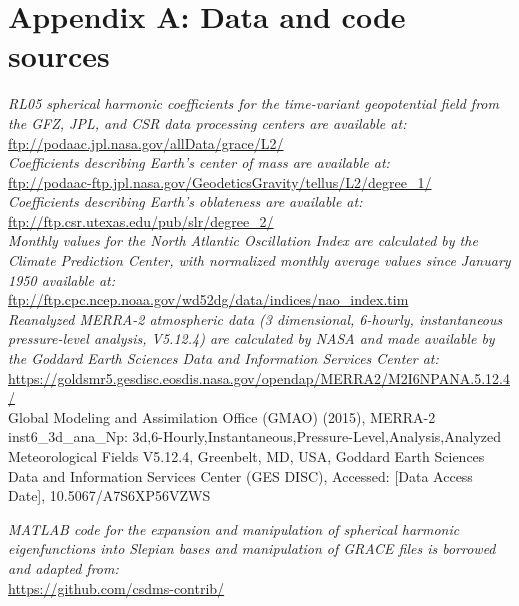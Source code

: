\newpage 
\appendix

\section{Appendix A: Data and code sources \label{app:a}}
\textit{RL05 spherical harmonic coefficients for the time-variant geopotential field from the GFZ, JPL, and CSR data processing centers are available at:} \\
\indent \url{ftp://podaac.jpl.nasa.gov/allData/grace/L2/}\\

\noindent\textit{Coefficients describing Earth's center of mass \cite[spherical harmonic degree~1, from][]{swenson2008} are available at:} \\
\indent\url{ftp://podaac-ftp.jpl.nasa.gov/GeodeticsGravity/tellus/L2/degree_1/}\\

\noindent\textit{Coefficients describing Earth's oblateness \cite[spherical harmonic degree~2, order~0, from][]{cheng2013} are available at:} \\
\indent \url{ftp://ftp.csr.utexas.edu/pub/slr/degree_2/}\\

\noindent\textit{Monthly values for the North Atlantic Oscillation Index are calculated by the Climate Prediction Center, with normalized monthly average values since January 1950 available at:} \\
\indent \url{ftp://ftp.cpc.ncep.noaa.gov/wd52dg/data/indices/nao_index.tim}\\

\noindent\textit{Reanalyzed MERRA-2 atmospheric data (3 dimensional, 6-hourly, instantaneous pressure-level analysis, V5.12.4) are calculated by NASA and made available by the Goddard Earth Sciences Data and Information Services Center at:} \\
\indent \url{https://goldsmr5.gesdisc.eosdis.nasa.gov/opendap/MERRA2/M2I6NPANA.5.12.4/}\\
Global Modeling and Assimilation Office (GMAO) (2015), MERRA-2 inst6_3d_ana_Np: 3d,6-Hourly,Instantaneous,Pressure-Level,Analysis,Analyzed Meteorological Fields V5.12.4, Greenbelt, MD, USA, Goddard Earth Sciences Data and Information Services Center (GES DISC), Accessed: [Data Access Date], 10.5067/A7S6XP56VZWS


\noindent\textit{MATLAB code for the expansion and manipulation of spherical harmonic
eigenfunctions into Slepian bases and manipulation of GRACE files is borrowed and adapted from:} \\
\indent \url{https://github.com/csdms-contrib/}\\

